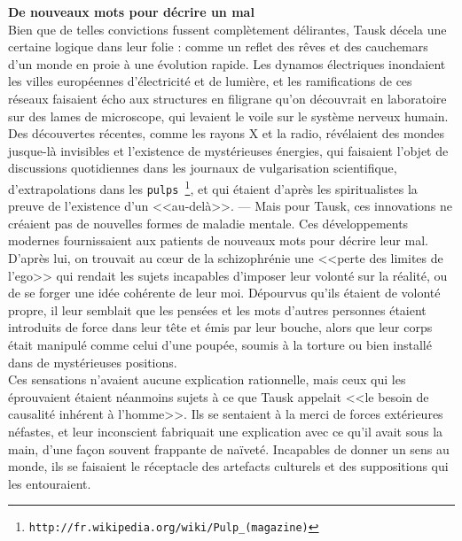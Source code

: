 \documentclass[11pt,twoside,a4paper]{article}
\begin{document}

\textbf{\Large De nouveaux mots pour d{\'e}crire un mal}~\\

Bien que de telles convictions fussent compl{\`e}tement d{\'e}lirantes, Tausk d{\'e}cela une certaine logique dans leur folie : comme un reflet des r{\^e}ves et des cauchemars d'un monde en proie {\`a} une {\'e}volution rapide. Les dynamos {\'e}lectriques inondaient les villes europ{\'e}ennes d'{\'e}lectricit{\'e} et de lumi{\`e}re, et les ramifications de ces r{\'e}seaux faisaient {\'e}cho aux structures en filigrane qu'on d{\'e}couvrait en laboratoire sur des lames de microscope, qui levaient le voile sur le syst{\`e}me nerveux humain.~\\

Des d{\'e}couvertes r{\'e}centes, comme les rayons X et la radio, r{\'e}v{\'e}laient des mondes jusque-l{\`a} invisibles et l'existence de myst{\'e}rieuses {\'e}nergies, qui faisaient l'objet de discussions quotidiennes dans les journaux de vulgarisation scientifique, d'extrapolations dans les \texttt{pulps~\footnote{\texttt{http://fr.wikipedia.org/wiki/Pulp\_(magazine)}}}, et qui {\'e}taient d'apr{\`e}s les spiritualistes la preuve de l'existence d'un <<au-del{\`a}>>. --- Mais pour Tausk, ces innovations ne cr{\'e}aient pas de nouvelles formes de maladie mentale. Ces d{\'e}veloppements modernes fournissaient aux patients de nouveaux mots pour d{\'e}crire leur mal.~\\

D'apr{\`e}s lui, on trouvait au c\oe ur de la schizophr{\'e}nie une <<perte des limites de l'ego>> qui rendait les sujets incapables d'imposer leur volont{\'e} sur la r{\'e}alit{\'e}, ou de se forger une id{\'e}e coh{\'e}rente de leur moi. D{\'e}pourvus qu'ils {\'e}taient de volont{\'e} propre, il leur semblait que les pens{\'e}es et les mots d'autres personnes {\'e}taient introduits de force dans leur t{\^e}te et {\'e}mis par leur bouche, alors que leur corps {\'e}tait manipul{\'e} comme celui d'une poup{\'e}e, soumis {\`a} la torture ou bien install{\'e} dans de myst{\'e}rieuses positions.~\\

Ces sensations n'avaient aucune explication rationnelle, mais ceux qui les {\'e}prouvaient {\'e}taient n{\'e}anmoins sujets {\`a} ce que Tausk appelait <<le besoin de causalit{\'e} inh{\'e}rent {\`a} l'homme>>. Ils se sentaient {\`a} la merci de forces ext{\'e}rieures n{\'e}fastes, et leur inconscient fabriquait une explication avec ce qu'il avait sous la main, d'une fa\c{c}on souvent frappante de na{\"i}vet{\'e}. Incapables de donner un sens au monde, ils se faisaient le r{\'e}ceptacle des artefacts culturels et des suppositions qui les entouraient.~\\
\end{document}
